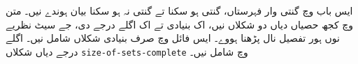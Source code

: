 \documentclass[../../../include/open-logic-chapter]{subfiles}
\begin{document}

\begin{editorial}
ایس باب وچ گنتی وار فہرستاں، گنتی ہو سکنا تے گنتی نہ ہو سکنا بیان ہوندے نیں۔ متن وچ کجھ حصیاں دیاں دو شکلاں نیں، اک بنیادی تے اک اگلے درجے دی، جے سیٹ نظریے نوں ہور تفصیل نال پڑھنا ہووے۔ ایس فائل وچ صرف بنیادی شکلاں شامل نیں۔ اگلے درجے دیاں شکلاں \verb|size-of-sets-complete| وچ شامل نیں۔
\end{editorial}











\OLEndChapterHook
\end{document}
